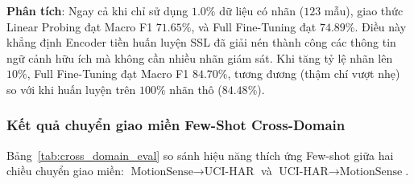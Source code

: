 \begin{table}[h!]
\centering
\caption{Kết quả đánh giá hiệu năng phân loại trên MotionSense theo các tỷ lệ nhãn (Mean $\pm$ Std qua 5 Seeds).}
\label{tab:in_domain_eval}
\end{table}

\textbf{Phân tích}: Ngay cả khi chỉ sử dụng $1.0\%$ dữ liệu có nhãn ($123$ mẫu), giao thức Linear Probing đạt Macro F1 $71.65\%$, và Full Fine-Tuning đạt $74.89\%$. Điều này khẳng định Encoder tiền huấn luyện SSL đã giải nén thành công các thông tin ngữ cảnh hữu ích mà không cần nhiều nhãn giám sát. Khi tăng tỷ lệ nhãn lên $10\%$, Full Fine-Tuning đạt Macro F1 $84.70\%$, tương đương (thậm chí vượt nhẹ) so với khi huấn luyện trên $100\%$ nhãn thô ($84.48\%$).

\subsubsection{Kết quả chuyển giao miền Few-Shot Cross-Domain}
Bảng~\ref{tab:cross_domain_eval} so sánh hiệu năng thích ứng Few-shot giữa hai chiều chuyển giao miền: $\text{MotionSense} \rightarrow \text{UCI-HAR}$ và $\text{UCI-HAR} \rightarrow \text{MotionSense}$.

